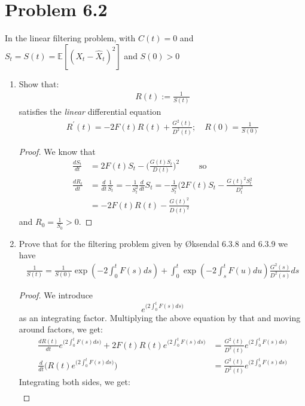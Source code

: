 \documentclass[11pt]{article}
\newcommand{\E}{\mathbb{E}}
\begin{document}
 \section*{Problem 6.2}
In the linear filtering problem, with $C(t)=0$ and $S_t=S(t) = \E[ (X_t - \hat{X}_t)^2]$ and $S(0)>0$
\begin{enumerate}
\item Show that: \begin{align*}
R(t):= \frac{1}{S(t)}
\end{align*}
satisfies the \textit{linear} differential equation 
\begin{align*}
R ^ { \prime } ( t ) = - 2 F ( t ) R ( t ) + \frac { G ^ { 2 } ( t ) } { D ^ { 2 } ( t ) } ; \quad R ( 0 ) = \frac { 1 } { S ( 0 ) }
\end{align*}
\begin{proof}
We know that 
\begin{align*}
\frac{dS_t}{dt} &= 2F(t) S_t - \Big( \frac{G(t) S_t}{D(t)} \Big)^2 \qquad \text{ so }\\
\frac{dR_t}{dt} &= \frac{d}{dt}\frac{1}{S_t}=-\frac{1}{S_t^2} \frac{d}{dt}S_t = -\frac{1}{S_t^2}(2F(t) S_t - \frac{G(t)^2 S_t^2}{D_t^2}\\
&= -2F(t) R(t) -\frac{G(t)^2}{D(t)^2}
\end{align*}
and $R_0 = \frac{1}{S_0}>0$.
\end{proof}
\item Prove that for the filtering problem given by \O ksendal 6.3.8 and 6.3.9 we have 
\begin{align*}
\frac { 1 } { S ( t ) } = \frac { 1 } { S ( 0 ) } \exp \left( - 2 \int _ { 0 } ^ { t } F ( s ) d s \right) + \int _ { 0 } ^ { t } \exp \left( - 2 \int _ { s } ^ { t } F ( u ) d u \right) \frac { G ^ { 2 } ( s ) } { D ^ { 2 } ( s ) } d s
\end{align*}
\begin{proof}
We introduce $$ e^{\big( 2 \int_0^t F(s) ds \big)}$$ as an integrating factor.  Multiplying the above equation by that and moving around factors, we get:
\begin{align*}
\frac{d R(t)}{dt}e^{\big( 2 \int_0^t F(s) ds \big)}+ 2F(t)R(t) e^{\big( 2 \int_0^t F(s) ds \big)} &= \frac{G^2(t)}{D^2(t)}e^{\big( 2 \int_0^t F(s) ds \big)}\\
\frac{d}{dt}\bigg(R(t)e^{\big( 2 \int_0^t F(s) ds \big)} \bigg) &= \frac{G^2(t)}{D^2(t)}e^{\big( 2 \int_0^t F(s) ds \big)}
\end{align*}
Integrating both sides, we get:
\begin{align*}

\end{align*}
\end{proof}
\end{enumerate}
\end{document}
